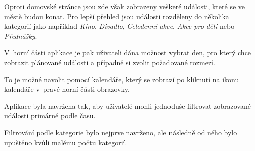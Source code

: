 \begin{minipage}[t]{0.45\textwidth}
  Oproti domovské stránce jsou zde však zobrazeny veškeré události, které se ve městě budou konat. Pro lepší přehled jsou události rozděleny 
  do několika kategorií jako například \textit{Kino}, \textit{Divadlo}, \textit{Celodenní akce}, \textit{Akce pro děti} nebo \textit{Přednášky}.
  
  V~horní části aplikace je pak uživateli dána možnost vybrat den, pro který chce zobrazit plánované události a případně si zvolit požadované rozmezí.

  To je možné navolit pomocí kalendáře, který se zobrazí po kliknutí na ikonu kalendáře v~pravé horní části obrazovky.
  
  
  
  Aplikace byla navržena tak, aby uživatelé mohli jednoduše filtrovat zobrazované události primárně podle času.
  
  Filtrování podle kategorie bylo nejprve navrženo, ale následně od něho bylo upuštěno kvůli malému počtu kategorií.
  

 
\end{minipage}
\hfill

